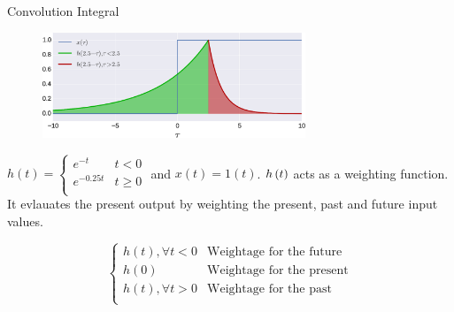 \documentclass[aspectratio=169]{beamer}
\def\lp{\ensuremath\left(}
\def\rp{\ensuremath\right)}
\begin{document}
\begin{frame}{Convolution Integral}
\begin{figure}
\includegraphics[width=0.7\textwidth]{img/imp_resp_mech.eps}
\end{figure}
\begin{small}
$h(t) = \begin{cases}
e^{-t} & t < 0 \\
e^{-0.25t} & t \geq 0 \\
\end{cases}$ and $x(t) = 1(t)$. $h\lp t\rp$ acts as a weighting function. It evlauates the present output by weighting the present, past and future input values.

\[ \begin{cases}
h(t), \forall t < 0 & \text{Weightage for the future} \\
h(0) & \text{Weightage for the present} \\
h(t), \forall t > 0 & \text{Weightage for the past} \\
\end{cases}
\]
\end{small}
\end{frame}
\end{document}
